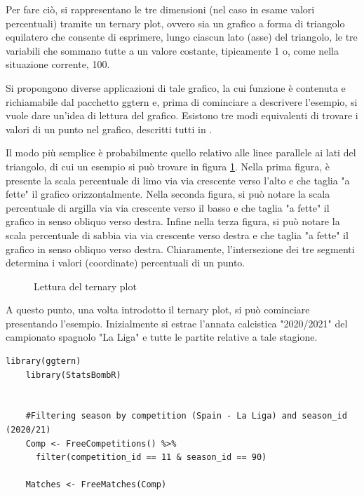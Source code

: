             Per fare ciò, si rappresentano le tre dimensioni (nel caso in esame valori percentuali) tramite un ternary plot, ovvero sia un grafico a forma di triangolo equilatero che consente di esprimere, lungo ciascun lato (asse) del triangolo, le tre variabili che sommano tutte a un valore costante, tipicamente 1 o, come nella situazione corrente, 100. 
            
            Si propongono diverse applicazioni di tale grafico, la cui funzione è contenuta e richiamabile dal pacchetto ggtern e, prima di cominciare a descrivere l'esempio, si vuole dare un'idea di lettura del grafico. Esistono tre modi equivalenti di trovare i valori di un punto nel grafico, descritti tutti in \cite{TernaryPlot}. 
            
            Il modo più semplice è probabilmente quello relativo alle linee parallele ai lati del triangolo, di cui un esempio si può trovare in figura \ref{fig:lettura}. Nella prima figura, è presente la scala percentuale di limo via via crescente verso l'alto e che taglia "a fette" il grafico orizzontalmente. Nella seconda figura, si può notare la scala percentuale di argilla via via crescente verso il basso e che taglia "a fette" il grafico in senso obliquo verso destra. Infine nella terza figura, si può notare la scala percentuale di sabbia via via crescente verso destra e che taglia "a fette" il grafico in senso obliquo verso destra. Chiaramente, l'intersezione dei tre segmenti determina i valori (coordinate) percentuali di un punto.

            \begin{figure}[h]
                \caption{Lettura del ternary plot}\label{fig:lettura}
            \end{figure}

            A questo punto, una volta introdotto il ternary plot, si può cominciare presentando l'esempio. Inizialmente si estrae l'annata calcistica "2020/2021" del campionato spagnolo "La Liga" e tutte le partite relative a tale stagione.

            \vspace{5pt}

            \begin{lstlisting}[numbers=None]
    library(ggtern)
    library(StatsBombR)
    
    
    #Filtering season by competition (Spain - La Liga) and season_id (2020/21)
    Comp <- FreeCompetitions() %>%
      filter(competition_id == 11 & season_id == 90)
    
    Matches <- FreeMatches(Comp)
            \end{lstlisting}
            
